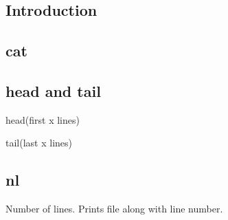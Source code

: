 
\subsection{Introduction}
 
\subsection{cat}

\subsection{head and tail}
head(first x lines)

tail(last x lines)

\subsection{nl}

Number of lines. Prints file along with line number.
